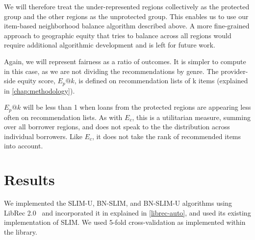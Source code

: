 
We will therefore treat the under-represented regions collectively as the protected group and the other regions as the unprotected group. This enables us to use our item-based neighborhood balance algorithm described above. A more fine-grained approach to geographic equity that tries to balance across all regions would require additional algorithmic development and is left for future work. 

Again, we will represent fairness as a ratio of outcomes. It is simpler to compute in this case, as we are not dividing the recommendations by genre. The provider-side equity score, $E_p@k$, is defined on recommendation lists of k items (explained in \ref{chap:methodology}). 




$E_p@k$ will be less than 1 when loans from the protected regions are appearing less often on recommendation lists. As with $E_c$, this is a utilitarian measure, summing over all borrower regions, and does not speak to the the distribution across individual borrowers. Like $E_c$, it does not take the rank of recommended items into account.


\section{Results}

We implemented the SLIM-U, BN-SLIM, and BN-SLIM-U algorithms using LibRec 2.0~\cite{guo2015librec} and incorporated it in \libauto{} explained in \ref{librec-auto}, and used its existing implementation of SLIM. We used 5-fold cross-validation as implemented within the library.

